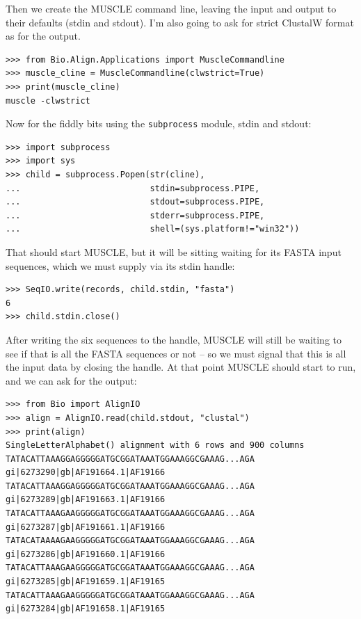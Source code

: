 \documentclass{report}
\begin{document}
Then we create the MUSCLE command line, leaving the input and output to their
defaults (stdin and stdout). I'm also going to ask for strict ClustalW format
as for the output.

\begin{verbatim}
>>> from Bio.Align.Applications import MuscleCommandline
>>> muscle_cline = MuscleCommandline(clwstrict=True)
>>> print(muscle_cline)
muscle -clwstrict
\end{verbatim}

Now for the fiddly bits using the \verb|subprocess| module, stdin and stdout:

\begin{verbatim}
>>> import subprocess
>>> import sys
>>> child = subprocess.Popen(str(cline),
...                          stdin=subprocess.PIPE,
...                          stdout=subprocess.PIPE,
...                          stderr=subprocess.PIPE,
...                          shell=(sys.platform!="win32"))                     
\end{verbatim}

That should start MUSCLE, but it will be sitting waiting for its FASTA input
sequences, which we must supply via its stdin handle:

\begin{verbatim}
>>> SeqIO.write(records, child.stdin, "fasta")
6
>>> child.stdin.close()
\end{verbatim}

After writing the six sequences to the handle, MUSCLE will still be waiting
to see if that is all the FASTA sequences or not -- so we must signal that
this is all the input data by closing the handle. At that point MUSCLE should
start to run, and we can ask for the output:

\begin{verbatim}
>>> from Bio import AlignIO
>>> align = AlignIO.read(child.stdout, "clustal")
>>> print(align)
SingleLetterAlphabet() alignment with 6 rows and 900 columns
TATACATTAAAGGAGGGGGATGCGGATAAATGGAAAGGCGAAAG...AGA gi|6273290|gb|AF191664.1|AF19166
TATACATTAAAGGAGGGGGATGCGGATAAATGGAAAGGCGAAAG...AGA gi|6273289|gb|AF191663.1|AF19166
TATACATTAAAGAAGGGGGATGCGGATAAATGGAAAGGCGAAAG...AGA gi|6273287|gb|AF191661.1|AF19166
TATACATAAAAGAAGGGGGATGCGGATAAATGGAAAGGCGAAAG...AGA gi|6273286|gb|AF191660.1|AF19166
TATACATTAAAGAAGGGGGATGCGGATAAATGGAAAGGCGAAAG...AGA gi|6273285|gb|AF191659.1|AF19165
TATACATTAAAGAAGGGGGATGCGGATAAATGGAAAGGCGAAAG...AGA gi|6273284|gb|AF191658.1|AF19165
\end{verbatim}
\end{document}
